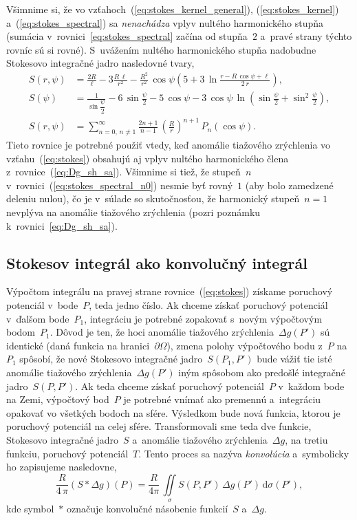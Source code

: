 \documentclass[a4paper, 12pt]{book}
\newcommand{\diff}{\mathrm d}
\begin{document}
Všimnime si, že vo vzťahoch~(\ref{eq:stokes_kernel_general}), 
(\ref{eq:stokes_kernel}) a~(\ref{eq:stokes_spectral}) sa \emph{nenachádza} 
vplyv nultého harmonického stupňa (sumácia v~rovnici~\ref{eq:stokes_spectral} 
začína od stupňa~$2$ a~pravé strany týchto rovníc sú si rovné).  S~uvážením 
nultého harmonického stupňa nadobudne Stokesovo integračné jadro nasledovné 
tvary,
%
\begin{align}
S(r, \psi) &= \frac{2R}{\ell} - 3\frac{R \, \ell}{r^2} - \frac{R^2}{r^2} \, 
\cos\psi\left( 5 + 3 \, \ln \frac{r - R \, \cos\psi + \ell}{2 \, r} \right){,}
\label{eq:stokes_kernel_general_n0}
\\
%
S(\psi) &= \frac{1}{\sin\dfrac{\psi}{2}} - 6 \, \sin\frac{\psi}{2} - 5 \, 
\cos\psi - 3 \, \cos\psi \, \ln\left( \sin\frac{\psi}{2} + \sin^2\frac{\psi}{2} 
\right){,}
\label{eq:stokes_kernel_n0}
\\
%
S(r, \psi) &= \sum_{n = 0{,}\, n \neq 1}^{\infty} \frac{2n + 1}{n - 1} \, 
\left( \frac{R}{r} \right)^{n + 1} \, P_n(\cos\psi){.}
\label{eq:stokes_spectral_n0}
\end{align}
%
Tieto rovnice je potrebné použiť vtedy, keď anomálie tiažového zrýchlenia vo 
vzťahu~(\ref{eq:stokes}) obsahujú aj vplyv nultého harmonického člena 
z~rovnice~(\ref{eq:Dg_sh_sa}).  Všimnime si tiež, že stupeň~$n$ 
v~rovnici~(\ref{eq:stokes_spectral_n0}) nesmie byť rovný~$1$ (aby bolo 
zamedzené deleniu nulou), čo je v~súlade so skutočnosťou, že harmonický 
stupeň~$n = 1$ nevplýva na anomálie tiažového zrýchlenia (pozri poznámku 
k~rovnici~\ref{eq:Dg_sh_sa}).


\subsection{Stokesov integrál ako konvolučný integrál}
\label{sec:stokes_convolution}

Výpočtom integrálu na pravej strane rovnice~(\ref{eq:stokes}) získame poruchový 
potenciál v~bode~$P$, teda jedno číslo.  Ak chceme získať poruchový potenciál 
v~ďalšom bode~$P_1$, integráciu je potrebné zopakovať s~novým výpočtovým 
bodom~$P_1$.  Dôvod je ten, že hoci anomálie tiažového zrýchlenia~$\Delta 
g(P')$ sú identické (daná funkcia na hranici~$\partial\Omega$), zmena polohy 
výpočtového bodu z~$P$ na~$P_1$ spôsobí, že nové Stokesovo integračné 
jadro~$S(P_1, P')$ bude vážiť tie isté anomálie tiažového zrýchlenia~$\Delta 
g(P')$ iným spôsobom ako predošlé integračné jadro~$S(P, P')$.  Ak teda chceme 
získať poruchový potenciál~$P$ v~každom bode na Zemi, výpočtový bod~$P$ je 
potrebné vnímať ako premennú a~integráciu opakovať vo všetkých bodoch na sfére.  
Výsledkom bude nová funkcia, ktorou je poruchový potenciál na celej sfére.  
Transformovali sme teda dve funkcie, Stokesovo integračné jadro~$S$ a~anomálie 
tiažového zrýchlenia~$\Delta g$, na tretiu funkciu, poruchový potenciál~$T$.  
Tento proces sa nazýva \emph{konvolúcia} a~symbolicky ho zapisujeme nasledovne,
%
\begin{equation}
\label{eq:stokes_convolution}
\frac{R}{4 \, \pi}(S * \Delta g)(P) = \frac{R}{4\pi} \, \iint\limits_\sigma 
S(P, P') \, \Delta g(P') \, \diff\sigma(P'){,}
\end{equation}
%
kde symbol~$*$ označuje konvolučné násobenie funkcií~$S$ a~$\Delta g$.
\end{document}

